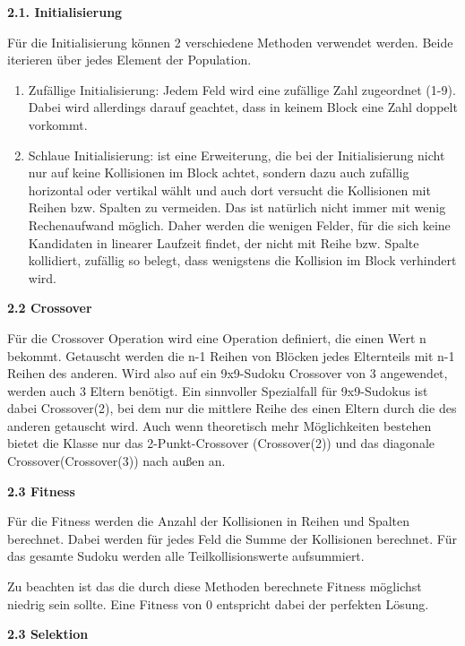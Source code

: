\noindent\textbf{2.1. Initialisierung}

\noindent Für die Initialisierung können 2 verschiedene Methoden verwendet werden. Beide iterieren über jedes Element der Population.
\begin{enumerate}
    \item Zufällige Initialisierung: Jedem Feld wird eine zufällige Zahl zugeordnet (1-9). Dabei wird allerdings darauf geachtet, dass in keinem Block eine Zahl doppelt vorkommt.
    \item Schlaue Initialisierung: ist eine Erweiterung, die bei der Initialisierung nicht nur auf keine Kollisionen im Block achtet, sondern dazu auch zufällig
    horizontal oder vertikal wählt und auch dort versucht die Kollisionen mit Reihen bzw. Spalten zu vermeiden. Das ist natürlich nicht immer mit wenig Rechenaufwand möglich.
    Daher werden die wenigen Felder, für die sich keine Kandidaten in linearer Laufzeit findet, der nicht mit Reihe bzw. Spalte kollidiert, zufällig so belegt, dass wenigstens die Kollision im Block verhindert wird.
\end{enumerate}

\noindent\textbf{2.2 Crossover}

\noindent Für die Crossover Operation wird eine Operation definiert, die einen Wert n bekommt. Getauscht werden die n-1 Reihen von Blöcken jedes Elternteils mit n-1 Reihen des anderen. Wird also auf ein 9x9-Sudoku Crossover von 3 angewendet, werden auch 3 Eltern benötigt. 
Ein sinnvoller Spezialfall für 9x9-Sudokus ist dabei Crossover(2), bei dem nur die mittlere Reihe des einen Eltern durch die des anderen getauscht wird.
Auch wenn theoretisch mehr Möglichkeiten bestehen bietet die Klasse nur das 2-Punkt-Crossover (Crossover(2)) und das diagonale Crossover(Crossover(3)) nach außen an.

\noindent\textbf{2.3 Fitness}

\noindent Für die Fitness werden die Anzahl der Kollisionen in Reihen und Spalten berechnet. Dabei werden für jedes Feld die Summe der Kollisionen berechnet. Für das gesamte Sudoku werden alle Teilkollisionswerte aufsummiert.

\noindent Zu beachten ist das die durch diese Methoden berechnete Fitness möglichst niedrig sein sollte. Eine Fitness von 0 entspricht dabei der perfekten Lösung.

\noindent\textbf{2.3 Selektion}

